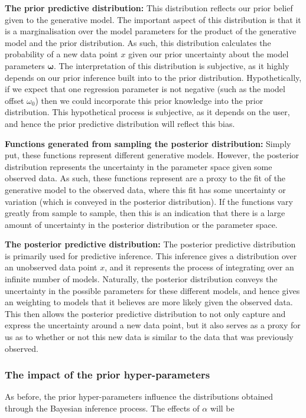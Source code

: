 \documentclass{article}
\begin{document}
\textbf{The prior predictive distribution:} This distribution reflects our prior belief given to the generative model. The important aspect of this distribution is that it is a marginalisation over the model parameters for the product of the generative model and the prior distribution. As such, this distribution calculates the probability of a new data point $x$ given our prior uncertainty about the model parameters $\boldsymbol\omega$. The interpretation of this distribution is subjective, as it highly depends on our prior inference built into to the prior distribution. Hypothetically, if we expect that one regression parameter is not negative (such as the model offset $\omega_0$) then we could incorporate this prior knowledge into the prior distribution. This hypothetical process is subjective, as it depends on the user, and hence the prior predictive distribution will reflect this bias.

\textbf{Functions generated from sampling the posterior distribution:} Simply put, these functions represent different generative models. However, the posterior distribution represents the uncertainty in the parameter space given some observed data. As such, these functions represent are a proxy to the fit of the generative model to the observed data, where this fit has some uncertainty or variation (which is conveyed in the posterior distribution). If the functions vary greatly from sample to sample, then this is an indication that there is a large amount of uncertainty in the posterior distribution or the parameter space.

\textbf{The posterior predictive distribution:} The posterior predictive distribution is primarily used for predictive inference. This inference gives a distribution over an unobserved data point $x$, and it represents the process of integrating over an infinite number of models. Naturally, the posterior distribution conveys the uncertainty in the possible parameters for these different models, and hence gives an weighting to models that it believes are more likely given the observed data. This then allows the posterior predictive distribution to not only capture and express the uncertainty around a new data point, but it also serves as a proxy for us as to whether or not this new data is similar to the data that was previously observed.

\subsubsection{The impact of the prior hyper-parameters}
As before, the prior hyper-parameters influence the distributions obtained through the Bayesian inference process. The effects of $\alpha$ will be 
\end{document}
